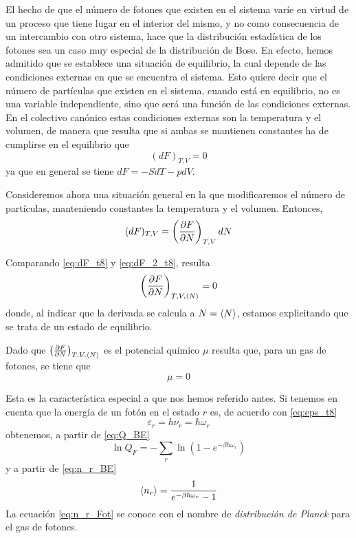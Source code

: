 El hecho de que el número de fotones que existen en el sistema varíe en virtud de un proceso que tiene lugar en el interior del mismo, y no como consecuencia de un intercambio con otro sistema, hace que la distribución estadística de los fotones sea un caso muy especial de la distribución de Bose.
En efecto, hemos admitido que se establece una situación de equilibrio, la cual depende de las condiciones externas en que se encuentra el sistema.
Esto quiere decir que el número de partículas que existen en el sistema, cuando está en equilibrio, no es una variable independiente, sino que será una función de las condiciones externas.
En el colectivo canónico estas condiciones externas son la temperatura y el volumen, de manera que resulta que si ambas se mantienen constantes ha de cumplirse en el equilibrio que
\begin{equation}\label{eq:dF_t8}
	(dF)_{T,V} = 0
\end{equation}
ya que en general se tiene $dF = -SdT - pdV$.

Consideremos ahora una situación general en la que modificaremos el número de partículas, manteniendo constantes la temperatura y el volumen.
Entonces,
\begin{equation}\label{eq:dF_2_t8}
	(dF)_{T,V} = \left( \pdv{F}{N} \right)_{T,V} dN
\end{equation}

Comparando \eqref{eq:dF_t8} y \eqref{eq:dF_2_t8}, resulta
\begin{equation}
	\left( \pdv{F}{N} \right)_{T,V, \expval{N}} = 0
\end{equation}
donde, al indicar que la derivada se calcula a $N = \expval{N}$, estamos explicitando que se trata de un estado de equilibrio.

Dado que $\left( \pdv{F}{N} \right)_{T,V, \expval{N}}$ es el potencial químico $\mu$ resulta que, para un gas de fotones, se tiene que
\begin{equation}
	\mu = 0
\end{equation}

Esta es la característica especial a que nos hemos referido antes.
Si tenemos en cuenta que la energía de un fotón en el estado $r$ es, de acuerdo con \eqref{eq:eps_t8}
\begin{equation}
	\varepsilon_r = h\nu_r = \hbar\omega_r
\end{equation}
obtenemos, a partir de \eqref{eq:Q_BE}
\begin{equation}
	\ln Q_F = -\sum_r \ln (1 - e^{-\beta\hbar\omega_r})
\end{equation}
y a partir de \eqref{eq:n_r_BE}
\begin{equation}\label{eq:n_r_Fot}
	\expval{n_r} = \frac{1}{e^{-\beta\hbar\omega_r} - 1}
\end{equation}
La ecuación \eqref{eq:n_r_Fot} se conoce con el nombre de \emph{distribución de Planck} para el gas de fotones.

